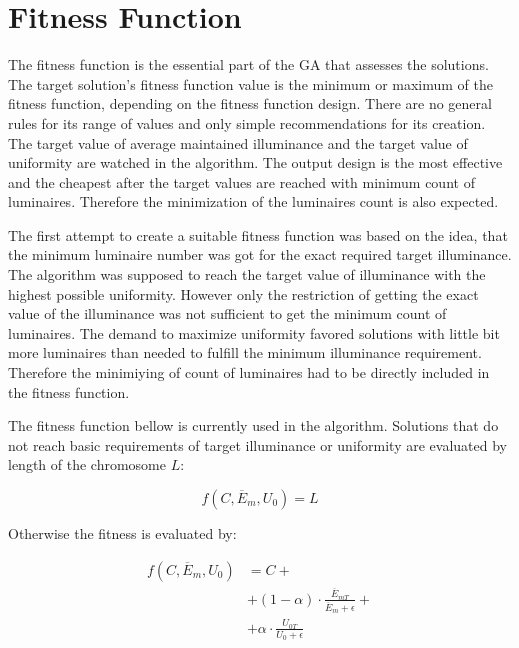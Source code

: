 \section{Fitness Function}
The fitness function is the essential part of the GA that assesses the solutions. The target solution's fitness function value is the minimum or maximum of the fitness function, depending on the fitness function design. There are no general rules for its range of values and only simple recommendations for its creation. The target value of average maintained illuminance and the target value of uniformity are watched in the algorithm. The output design is the most effective and the cheapest after the target values are reached with minimum count of luminaires. Therefore the minimization of the luminaires count is also expected.

The first attempt to create a suitable fitness function was based on the idea, that the minimum luminaire number was got for the exact required target illuminance. The algorithm was supposed to reach the target value of illuminance with the highest possible uniformity. However only the restriction of getting the exact value of the illuminance was not sufficient to get the minimum count of luminaires. The demand to maximize uniformity favored solutions with little bit more luminaires than needed to fulfill the minimum illuminance requirement. Therefore the minimiying of count of luminaires had to be directly included in the fitness function.

The fitness function bellow is currently used in the algorithm. Solutions that do not reach basic requirements of target illuminance or uniformity are evaluated by length of the chromosome $L$:

\begin{equation}
\label{eq:fitV2EUA}
	f\left(C,\overline{E}_{m}, U_0\right)= L
\end{equation}

\noindent Otherwise the fitness is evaluated by:

\begin{equation}
\label{eq:fitV2EUB}
\begin{split}
f\left(C, \overline{E}_{m}, U_0\right)&=C +\\
& + \left( 1 - \alpha\right)\cdot\frac{\overline{E}_{mT}}{\overline{E}_{m}+\epsilon} + \\
& + \alpha\cdot\frac{U_{0T}}{U_0 + \epsilon}
\end{split}
\end{equation}

